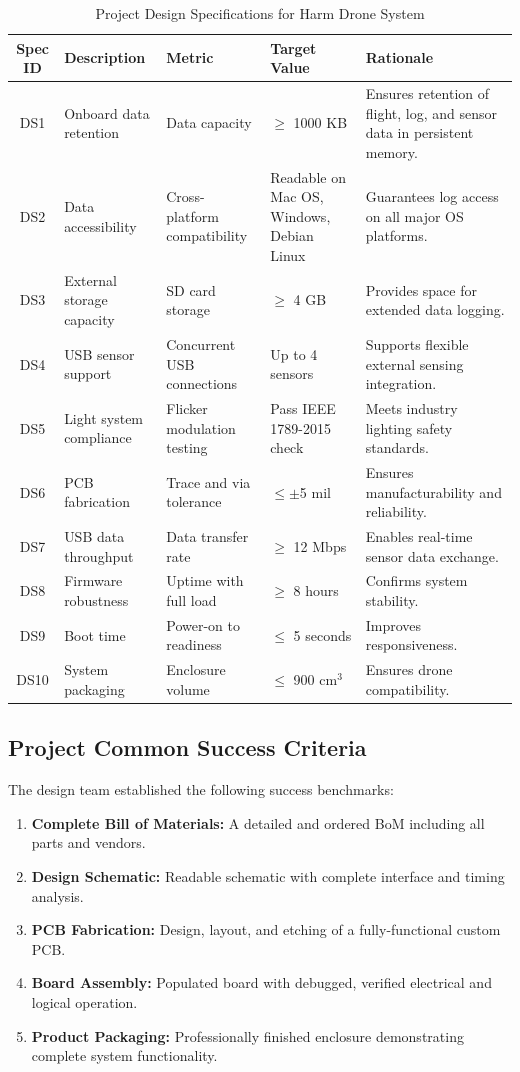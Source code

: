 \documentclass[12pt]{article}
\begin{document}
\begin{table}[H]
\centering
\begin{tabular}{|c|p{4cm}|p{3cm}|p{3cm}|p{4cm}|}
\hline
\textbf{Spec ID} & \textbf{Description} & \textbf{Metric} & \textbf{Target Value} & \textbf{Rationale} \\
\hline
DS1 & Onboard data retention & Data capacity & $\geq$ 1000 KB & Ensures retention of flight, log, and sensor data in persistent memory. \\
\hline
DS2 & Data accessibility & Cross-platform compatibility & Readable on Mac OS, Windows, Debian Linux & Guarantees log access on all major OS platforms. \\
\hline
DS3 & External storage capacity & SD card storage & $\geq$ 4 GB & Provides space for extended data logging. \\
\hline
DS4 & USB sensor support & Concurrent USB connections & Up to 4 sensors & Supports flexible external sensing integration. \\
\hline
DS5 & Light system compliance & Flicker modulation testing & Pass IEEE 1789-2015 check & Meets industry lighting safety standards. \\
\hline
DS6 & PCB fabrication & Trace and via tolerance & $\leq \pm$5 mil & Ensures manufacturability and reliability. \\
\hline
DS7 & USB data throughput & Data transfer rate & $\geq$ 12 Mbps & Enables real-time sensor data exchange. \\
\hline
DS8 & Firmware robustness & Uptime with full load & $\geq$ 8 hours & Confirms system stability. \\
\hline
DS9 & Boot time & Power-on to readiness & $\leq$ 5 seconds & Improves responsiveness. \\
\hline
DS10 & System packaging & Enclosure volume & $\leq$ 900 cm$^3$ & Ensures drone compatibility. \\
\hline
\end{tabular}
\caption{Project Design Specifications for Harm Drone System}
\end{table}

\subsection{Project Common Success Criteria}

The design team established the following success benchmarks:
\begin{enumerate}
    \item \textbf{Complete Bill of Materials:} A detailed and ordered BoM including all parts and vendors.
    \item \textbf{Design Schematic:} Readable schematic with complete interface and timing analysis.
    \item \textbf{PCB Fabrication:} Design, layout, and etching of a fully-functional custom PCB.
    \item \textbf{Board Assembly:} Populated board with debugged, verified electrical and logical operation.
    \item \textbf{Product Packaging:} Professionally finished enclosure demonstrating complete system functionality.
\end{enumerate}
\end{document}
